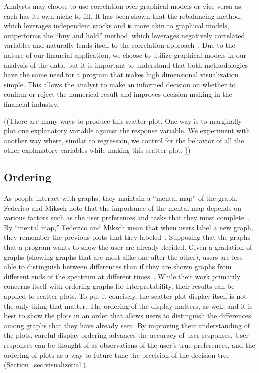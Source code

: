 Analysts may choose to use correlation over graphical models or vice versa as each has its own niche to fill. It has been shown that the rebalancing method, which leverages independent stocks and is more akin to graphical models, outperforms the ``buy and hold'' method, which leverages negatively correlated variables and naturally lends itself to the correlation approach~\cite{liuh2016}. Due to the nature of our financial application, we choose to utilize graphical models in our analysis of the data, but it is important to understand that both methodologies have the same need for a program that makes high dimensional visualization simple. This allows the analyst to make an informed decision on whether to confirm or reject the numerical result and improves decision-making in the financial industry.

((There are many ways to produce this scatter plot. One way is to marginally plot one explanatory variable against the response variable. We experiment with another way where, similar to regression, we control for the behavior of all the other explanatory variables while making this scatter plot. ))

\subsection{Ordering}

As people interact with graphs, they maintain a ``mental map'' of the graph. Federico and Miksch note that the importance of the mental map depends on various factors such as the user preferences and tasks that they must complete~\cite{federico2016}. By ``mental map,'' Federico and Miksch mean that when users label a new graph, they remember the previous plots that they labeled~\cite{federico2016}. Supposing that the graphs that a program wants to show the user are already decided. Given a gradation of graphs (showing graphs that are most alike one after the other), users are less able to distinguish between differences than if they are shown graphs from different ends of the spectrum at different times~\cite{federico2016}. While their work primarily concerns itself with ordering graphs for interpretability, their results can be applied to scatter plots. To put it concisely, the scatter plot display itself is not the only thing that matter. The ordering of the display matters, as well, and it is best to show the plots in an order that allows users to distinguish the differences among graphs that they have already seen. By improving their understanding of the plots, careful display ordering advances the accuracy of user responses. User responses can be thought of as observations of the user’s true preferences, and the ordering of plots as a way to future tune the precision of the decision tree (Section~\ref{sec:visualizer:al}). 

